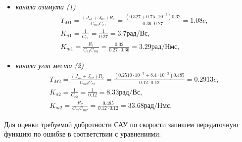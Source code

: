 \begin{itemize}
	\item \textit{канала азимута (1)}
	\begin{equation}
	\label{eq:p4:sec4/4}
	\begin{alignedat}{2}
	T_{M1}=
	\frac{ \left( J_{\textit{н1}}+J_{01} \right) R_{1}}{C_{m1}C_{e1}}=\frac{ \left( 0.327 + 0.75 \cdot 10^{-5} \right) 0.32}{0.36 \cdot 0.27}=
	1.08 \textit{c} ,\\
	K_{n1} = \frac{1}{C_{e1}} = \frac{1}{0.27} = 3.7 \textit{рад/Вс},\\
	K_{m1} = \frac{R_1}{C_{e1} C_{m1}} = \frac{0.32}{0.27 \cdot 0.36} = 3.29 \textit{рад/Нмс},
	\end{alignedat}
	\end{equation}
	
	\item \textit{канала угла места (2)}
	\begin{equation}
	\label{eq:p4:sec4/4+}
	\begin{alignedat}{2}
	T_{M2}=
	\frac{ \left( J_{\textit{н2}}+J_{02} \right) R_{2}}{C_{m2}C_{e2}}=\frac{ \left( 0.2510 \cdot 10^{-5} + 8.4 \cdot 10^{-3} \right) 0.485}{0.12 \cdot 0.12}=
	0.2913 \textit{c} ,\\
	K_{n2} = \frac{1}{C_{e2}} = \frac{1}{0.12} = 8.33 \textit{рад/Вс},\\
	K_{m2} = \frac{R_2}{C_{e2} C_{m2}} = \frac{0.485}{0.12 \cdot 0.12} = 33.68 \textit{рад/Нмс},
	\end{alignedat}
	\end{equation}
	
\end{itemize}



Для оценки требуемой добротности САУ по скорости запишем передаточную функцию по ошибке в соответствии с уравнениями:\par


